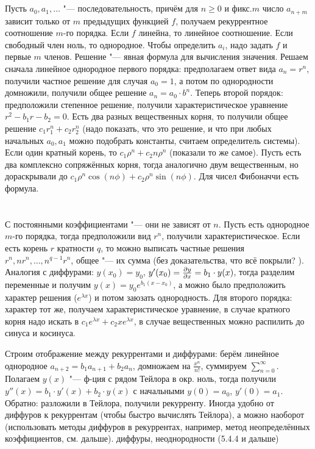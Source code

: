 \section{} %
Пусть $a_0, a_1, \dots$ "--- последовательность, причём для $n\ge 0$ и фикс.$m$
число $a_{n+m}$ зависит только от $m$ предыдущих функцией $f$, получаем рекуррентное соотношение $m$-го порядка.
Если $f$ линейна, то линейное соотношение.
Если свободный член ноль, то однородное.
Чтобы определить $a_i$, надо задать $f$ и первые $m$ членов.
Решение "--- явная формула для вычисления значения.
Решаем сначала линейное однородное первого порядка: предполагаем ответ вида $a_n=r^n$, получили частное решение
для случая $a_0=1$, а потом по однородности домножили, получили общее решение $a_n=a_0\cdot b^n$.
Теперь второй порядок: предположили степенное решение, получили характеристическое уравнение $r^2-b_1r-b_2=0$.
Есть два разных вещественных корня, то получили общее решение $c_1r_1^n+c_2r_2^n$ (надо показать, что это решение,
и что при любых начальных $a_0, a_1$ можно подобрать константы, считаем определитель системы).
Если один кратный корень, то $c_1\rho^n+c_2n\rho^n$ (показали то же самое).
Пусть есть два комплексно сопряжённых корня, тогда аналогично двум вещественным, но дораскрывали до
$c_1 \rho^n \cos (n \phi) + c_2\rho^n \sin(n \phi)$.
Для чисел Фибоначчи есть формула.

\section{} %
С постоянными коэффициентами "--- они не зависят от $n$.
Пусть есть однородное $m$-го порядка, тогда предположили вид $r^n$, получили характеристическое.
Если есть корень $r$ кратности $q$, то можно выписать частные решения $r^n, nr^n, \dots, n^{q-1}r^n$,
общее "--- их сумма (без доказательства, что всё покрыли? \TODO).
Аналогия с диффурами: $y(x_0)=y_0$, $y'(x_0)=\frac{\partial y}{\partial x}=b_1\cdot y(x)$, тогда разделим переменные и получим
$y(x)=y_0e^{b_1(x-x_0)}$, а можно было предположить характер решения ($e^{\lambda x}$) и потом заюзать однородность.
Для второго порядка: характер тот же, получаем характеристическое уравнение, в случае кратного корня
надо искать в $c_1e^{\lambda x}+c_2xe^{\lambda x}$, в случае вещественных можно распилить до синуса и косинуса.

Строим отображение между рекуррентами и диффурами: берём линейное однородное $a_{n+2}=b_1a_{n+1}+b_2a_n$,
домножаем на $\frac{x^n}{n!}$, суммируем $\sum_{n=0}^\infty$.
Полагаем $y(x)$ "--- ф-ция с рядом Тейлора в окр. ноль, тогда получили $y''(x)=b_1\cdot y'(x) + b_2 \cdot y(x)$
с начальными $y(0)=a_0$, $y'(0)=a_1$.
Обратно: разложили в Тейлора, получили рекурренту.
Иногда удобно от диффуров к рекуррентам (чтобы быстро вычислять Тейлора), а можно наоборот (использовать методы диффуров в рекуррентах,
например, метод неопределённых коэффициентов, см. дальше).
\TODO диффуры, неоднородности (5.4.4 и дальше)

